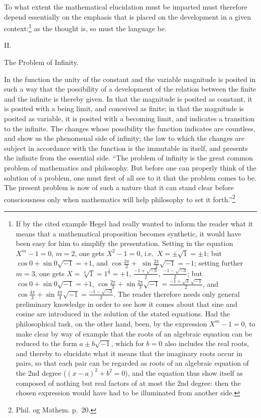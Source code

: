 \documentclass[12pt,a4paper,openany]{book}
\newcommand{\opage}[1]{\marginnote{\footnotesize\textit{[#1]}}}
\begin{document}
To what extent the mathematical elucidation must be imparted
must therefore depend essentially on the emphasis that is placed on the development in a
given context:\footnote[2]{If by the cited example Hegel had really wanted to inform the reader what it means that a mathematical proposition becomes synthetic, it would have been easy for him to simplify the presentation. Setting in the equation $X^{m}-1=0$, $m=2$, one gets $X^{2}-1=0$, i.e.\ $X=\pm\sqrt{1}=\pm 1$; but $\cos 0+\sin 0\sqrt{-1}=+1$, and $\cos\frac{2\pi}{2}+$ $\sin\frac{2\pi}{2}\sqrt{-1}=-1$; setting further $m=3$, one gets $X=\sqrt[3]{1}=1^{\frac{1}{3}}=+1$, $\frac{-1+\sqrt{-3}}{2}$, $\frac{-1-\sqrt{-3}}{2}$; but $\cos 0+\sin 0\sqrt{-1}=+1$, $\cos\frac{2\pi}{3}+\sin\frac{2\pi}{3}\sqrt{-1}=\frac{-1+\sqrt{3}\ \sqrt{-1}}{2}$, and $\cos\frac{4\pi}{3}+\sin\frac{4\pi}{3}\sqrt{-1}=\frac{-1-\sqrt{-3}}{2}$. The reader therefore needs only general preliminary knowledge in order to see how it comes about that sine and cosine are introduced in the solution of the stated equations. Had the philosophical task, on the other hand, been, by the expression $X^{m}-1=0$, to make clear by way of example that the roots of an algebraic equation can be reduced to the form $a\pm b\sqrt{-1}$, which for $b=0$ also includes the real roots, and thereby to elucidate what it means that the imaginary roots occur in pairs, so that each pair can be regarded as roots of an algebraic equation of the 2nd degree ($(x-a)^{2}+b^{2}=0$), and the equation thus show itself as composed of nothing but real factors of at most the 2nd degree: then the chosen expression would have had to be illuminated from another side.} as the thought
is, so must the language be.
\setcounter{footnote}{0}%
\opage{28}
\begin{center}II.\end{center}

\begin{center}The Problem of Infinity.\end{center}

In the function the unity of the constant and the
variable magnitude is posited in such a way that the possibility of a development
of the relation between the finite and the infinite
is thereby given. In that the magnitude is posited as constant, it is posited
with a being limit, and conceived as finite; in that the magnitude
is posited as variable, it is posited with a becoming limit,
and indicates a transition to the infinite. The changes
whose possibility the function indicates are countless, and
show us the phenomenal side of infinity; the law to which the changes
are subject in accordance with the function is the immutable in itself,
and presents the infinite from the essential
side. ``The problem of infinity is the great common problem of mathematics and
\setcounter{footnote}{0}%
\opage{29}philosophy. But before one can properly think
of the solution of a problem, one must first of all see to it that
the problem comes to be. The present problem is now of
such a nature that it can stand clear before consciousness only
when mathematics will help philosophy to
set it forth.''\footnote[1]{Phil. og Mathem. p.\ 20.}
\end{document}
